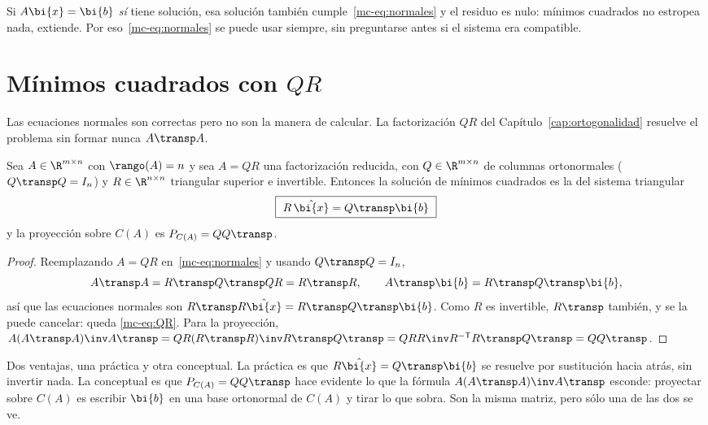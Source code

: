 \begin{remark}\label{mc-obs:compatible}
Si $A\bi{x}=\bi{b}$ \emph{sí} tiene solución, esa solución también
cumple~\eqref{mc-eq:normales} y el residuo es nulo: mínimos cuadrados no
estropea nada, extiende. Por eso~\eqref{mc-eq:normales} se puede usar siempre,
sin preguntarse antes si el sistema era compatible.
\end{remark}

\section{Mínimos cuadrados con \texorpdfstring{$QR$}{QR}}\label{mc-sec:QR}

Las ecuaciones normales son correctas pero no son la manera de calcular. La
factorización $QR$ del Capítulo~\ref{cap:ortogonalidad} resuelve el problema
sin formar nunca $A\transp A$.

\begin{proposition}\label{mc-prop:QR}
Sea $A\in\R^{m\times n}$ con $\rango(A)=n$ y sea $A=QR$ una factorización
reducida, con $Q\in\R^{m\times n}$ de columnas ortonormales
($Q\transp Q=I_n$) y $R\in\R^{n\times n}$ triangular superior e invertible.
Entonces la solución de mínimos cuadrados es la del sistema triangular
\begin{equation}\label{mc-eq:QR}
\boxed{\ R\,\hat{\bi{x}}=Q\transp\bi{b}\ }
\end{equation}
y la proyección sobre $C(A)$ es $P_{C(A)}=QQ\transp$.
\end{proposition}

\begin{proof}
Reemplazando $A=QR$ en~\eqref{mc-eq:normales} y usando $Q\transp Q=I_n$,
\[
A\transp A=R\transp Q\transp QR=R\transp R ,
\qquad A\transp\bi{b}=R\transp Q\transp\bi{b} ,
\]
así que las ecuaciones normales son $R\transp R\hat{\bi{x}}=R\transp Q\transp\bi{b}$.
Como $R$ es invertible, $R\transp$ también, y se la puede cancelar: queda
\eqref{mc-eq:QR}. Para la proyección, $A(A\transp A)\inv A\transp
=QR(R\transp R)\inv R\transp Q\transp=QRR\inv R^{-\mathsf T}R\transp Q\transp=QQ\transp$.
\end{proof}

Dos ventajas, una práctica y otra conceptual. La práctica es que
$R\hat{\bi{x}}=Q\transp\bi{b}$ se resuelve por sustitución hacia atrás, sin
invertir nada. La conceptual es que $P_{C(A)}=QQ\transp$ hace evidente lo que
la fórmula $A(A\transp A)\inv A\transp$ esconde: proyectar sobre $C(A)$ es
escribir $\bi{b}$ en una base ortonormal de $C(A)$ y tirar lo que sobra. Son la
misma matriz, pero sólo una de las dos se ve.

